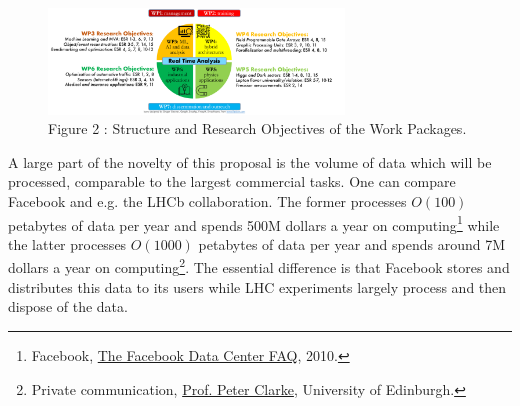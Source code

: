  \begin{figure}
	\includegraphics[width=0.7\textwidth]{figs/WPs} %
	\caption*{Figure 2 : Structure and Research Objectives of the Work Packages.\label{fig:WPs}}
\end{figure}
A large part of the novelty of this proposal is the volume of data which will be processed, comparable to the largest commercial tasks. 
One can compare Facebook and e.g. the LHCb collaboration.
The former processes $O(100)$ petabytes of data per year and spends 500M dollars a year on computing\footnote{Facebook, \href{http://www.datacenterknowledge.com/the-facebook-data-center-faq-page-three/}{The Facebook Data Center FAQ}, 2010.} while the latter processes  $O(1000)$ petabytes of data per year and spends around 7M dollars a year on computing\footnote{Private communication, \href{mailto:peter.clarke@ed.ac.uk}{Prof. Peter Clarke}, University of Edinburgh.}.
The essential difference is that Facebook stores and distributes this data to its users while LHC experiments largely process and then dispose of the data.

